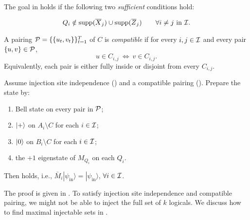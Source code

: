 The goal in  holds
if the following two \emph{sufficient} conditions hold:

\begin{definition}
    \label{def:injection-site-independence}
\begin{equation}
Q_i \notin \mathrm{supp}(\overline{X}_j)\cup \mathrm{supp}(\overline{Z}_j) \qquad \forall i\neq j \text{ in }\mathcal{I}.
\end{equation}
\end{definition}

\begin{definition}
    \label{def:generic-compatible}
    A pairing $\mathcal{P}=\{\{u_t,v_t\}\}_{t=1}^T$ of $C$ is \emph{compatible} if for every $i,j\in\mathcal{I}$ and every pair $\{u,v\}\in\mathcal{P}$,
    \begin{equation}
    u\in C_{i,j}\ \Longleftrightarrow\ v\in C_{i,j}.
    \end{equation}
    Equivalently, each pair is either fully inside or disjoint from every $C_{i,j}$.
\end{definition}

\begin{theorem}
\label{thm:unified-sufficient-condition}
Assume injection site independence () and a compatible pairing ().
Prepare the state by:
\begin{enumerate}
    \item Bell state on every pair in $\mathcal{P}$;
    \item $\ket{+}$ on $A_i\setminus C$ for each $i\in\mathcal{I}$;
    \item $\ket{0}$ on $B_i\setminus C$ for each $i\in\mathcal{I}$;
    \item the $+1$ eigenstate of $M_{Q_i}$ on each $Q_i$.
\end{enumerate}
Then  holds, i.e.,
$
\bar M_i|\psi_{\mathrm{in}}\rangle = |\psi_{\mathrm{in}}\rangle
$, $\forall i\in\mathcal{I}$.
\end{theorem}
The proof is given in . To satisfy injection site independence and compatible pairing,
we might not be able to inject the full set of $ k $ logicals.
We discuss how to find maximal injectable sets in .


